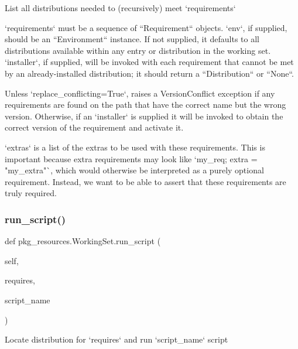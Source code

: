 \begin{DoxyVerb}List all distributions needed to (recursively) meet `requirements`

`requirements` must be a sequence of ``Requirement`` objects.  `env`,
if supplied, should be an ``Environment`` instance.  If
not supplied, it defaults to all distributions available within any
entry or distribution in the working set.  `installer`, if supplied,
will be invoked with each requirement that cannot be met by an
already-installed distribution; it should return a ``Distribution`` or
``None``.

Unless `replace_conflicting=True`, raises a VersionConflict exception
if
any requirements are found on the path that have the correct name but
the wrong version.  Otherwise, if an `installer` is supplied it will be
invoked to obtain the correct version of the requirement and activate
it.

`extras` is a list of the extras to be used with these requirements.
This is important because extra requirements may look like `my_req;
extra = "my_extra"`, which would otherwise be interpreted as a purely
optional requirement.  Instead, we want to be able to assert that these
requirements are truly required.
\end{DoxyVerb}
 \mbox{\label{classpkg__resources_1_1_working_set_ab2b93a4b8818042f319d7f9d7d2884bf}} 
\subsubsection{\texorpdfstring{run\+\_\+script()}{run\_script()}}
{\footnotesize\ttfamily def pkg\+\_\+resources.\+Working\+Set.\+run\+\_\+script (\begin{DoxyParamCaption}\item[{}]{self,  }\item[{}]{requires,  }\item[{}]{script\+\_\+name }\end{DoxyParamCaption})}

\begin{DoxyVerb}Locate distribution for `requires` and run `script_name` script\end{DoxyVerb}
 \mbox{\label{classpkg__resources_1_1_working_set_a998b3678540dc5f39aa560f347c66d4b}} 
